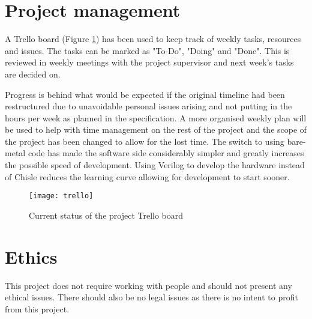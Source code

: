 \section{Project management}
A Trello board (Figure \ref{fig:trello}) has been used to keep track of weekly tasks, resources and issues. The tasks can be marked as "To-Do", "Doing" and "Done". This is reviewed in weekly meetings with the project supervisor and next week's tasks are decided on.

Progress is behind what would be expected if the original timeline had been restructured due to unavoidable personal issues arising and not putting in the hours per week as planned in the specification. A more organised weekly plan will be used to help with time management on the rest of the project and the scope of the project has been changed to allow for the lost time. The switch to using bare-metal code has made the software side considerably simpler and greatly increases the possible speed of development. Using Verilog to develop the hardware instead of Chisle reduces the learning curve allowing for development to start sooner.

\begin{figure}[H]
	\centering
	\texttt{[image: trello]}
	\caption{Current status of the project Trello board}
	\label{fig:trello}
\end{figure}

\section{Ethics}
This project does not require working with people and should not present any ethical issues. There should also be no legal issues as there is no intent to profit from this project.